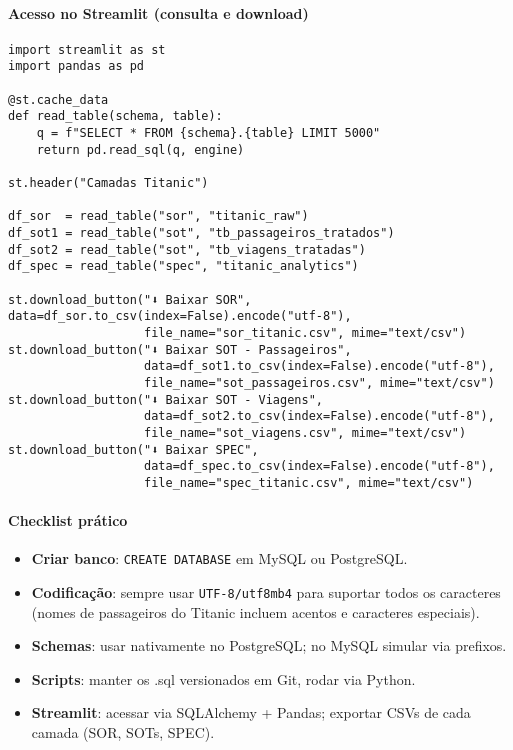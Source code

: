 \documentclass[12pt,a4paper]{article}
\begin{document}
\paragraph{Acesso no Streamlit (consulta e download)}
\begin{verbatim}
import streamlit as st
import pandas as pd

@st.cache_data
def read_table(schema, table):
    q = f"SELECT * FROM {schema}.{table} LIMIT 5000"
    return pd.read_sql(q, engine)

st.header("Camadas Titanic")

df_sor  = read_table("sor", "titanic_raw")
df_sot1 = read_table("sot", "tb_passageiros_tratados")
df_sot2 = read_table("sot", "tb_viagens_tratadas")
df_spec = read_table("spec", "titanic_analytics")

st.download_button("⬇️ Baixar SOR", data=df_sor.to_csv(index=False).encode("utf-8"),
                   file_name="sor_titanic.csv", mime="text/csv")
st.download_button("⬇️ Baixar SOT - Passageiros",
                   data=df_sot1.to_csv(index=False).encode("utf-8"),
                   file_name="sot_passageiros.csv", mime="text/csv")
st.download_button("⬇️ Baixar SOT - Viagens",
                   data=df_sot2.to_csv(index=False).encode("utf-8"),
                   file_name="sot_viagens.csv", mime="text/csv")
st.download_button("⬇️ Baixar SPEC",
                   data=df_spec.to_csv(index=False).encode("utf-8"),
                   file_name="spec_titanic.csv", mime="text/csv")
\end{verbatim}

\paragraph{Checklist prático}
\begin{itemize}
  \item \textbf{Criar banco}: \texttt{CREATE DATABASE} em MySQL ou PostgreSQL.
  \item \textbf{Codificação}: sempre usar \texttt{UTF-8/utf8mb4} para suportar todos os caracteres (nomes de passageiros do Titanic incluem acentos e caracteres especiais).
  \item \textbf{Schemas}: usar nativamente no PostgreSQL; no MySQL simular via prefixos.
  \item \textbf{Scripts}: manter os .sql versionados em Git, rodar via Python.
  \item \textbf{Streamlit}: acessar via SQLAlchemy + Pandas; exportar CSVs de cada camada (SOR, SOTs, SPEC).
\end{itemize}
\end{document}
